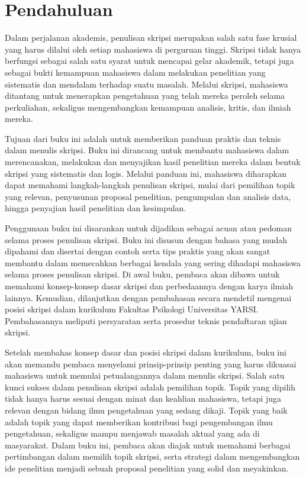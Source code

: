 \documentclass[
  indonesian,
  letterpaper,
]{scrbook}
\author{}
\date{}
\renewcommand*\contentsname{Daftar Isi}
\newcommand\contentsname{Daftar Isi}
\begin{document}
\frontmatter

\renewcommand*\contentsname{Daftar Isi}
{
\setcounter{tocdepth}{2}
\tableofcontents
}

\mainmatter
{}

\chapter*{\texorpdfstring{\textbf{Pendahuluan}}{Pendahuluan}}\label{pendahuluan}


Dalam perjalanan akademis, penulisan skripsi merupakan salah satu fase
krusial yang harus dilalui oleh setiap mahasiswa di perguruan tinggi.
Skripsi tidak hanya berfungsi sebagai salah satu syarat untuk mencapai
gelar akademik, tetapi juga sebagai bukti kemampuan mahasiswa dalam
melakukan penelitian yang sistematis dan mendalam terhadap suatu
masalah. Melalui skripsi, mahasiswa ditantang untuk menerapkan
pengetahuan yang telah mereka peroleh selama perkuliahan, sekaligus
mengembangkan kemampuan analisis, kritis, dan ilmiah mereka.

Tujuan dari buku ini adalah untuk memberikan panduan praktis dan teknis
dalam menulis skripsi. Buku ini dirancang untuk membantu mahasiswa dalam
merencanakan, melakukan dan menyajikan hasil penelitian mereka dalam
bentuk skripsi yang sistematis dan logis. Melalui panduan ini, mahasiswa
diharapkan dapat memahami langkah-langkah penulisan skripsi, mulai dari
pemilihan topik yang relevan, penyusunan proposal penelitian,
pengumpulan dan analisis data, hingga penyajian hasil penelitian dan
kesimpulan.

Penggunaan buku ini disarankan untuk dijadikan sebagai acuan atau
pedoman selama proses penulisan skripsi. Buku ini disusun dengan bahasa
yang mudah dipahami dan disertai dengan contoh serta tips praktis yang
akan sangat membantu dalam memecahkan berbagai kendala yang sering
dihadapi mahasiswa selama proses penulisan skripsi. Di awal buku,
pembaca akan dibawa untuk memahami konsep-konsep dasar skripsi dan
perbedaannya dengan karya ilmiah lainnya. Kemudian, dilanjutkan dengan
pembahasan secara mendetil mengenai posisi skripsi dalam kurikulum
Fakultas Psikologi Universitas YARSI. Pembahasannya meliputi persyaratan
serta prosedur teknis pendaftaran ujian skripsi.

Setelah membahas konsep dasar dan posisi skripsi dalam kurikulum, buku
ini akan memandu pembaca menyelami prinsip-prinsip penting yang harus
dikuasai mahasiswa untuk memulai petualangannya dalam menulis skripsi.
Salah satu kunci sukses dalam penulisan skripsi adalah pemilihan topik.
Topik yang dipilih tidak hanya harus sesuai dengan minat dan keahlian
mahasiswa, tetapi juga relevan dengan bidang ilmu pengetahuan yang
sedang dikaji. Topik yang baik adalah topik yang dapat memberikan
kontribusi bagi pengembangan ilmu pengetahuan, sekaligus mampu menjawab
masalah aktual yang ada di masyarakat. Dalam buku ini, pembaca akan
diajak untuk memahami berbagai pertimbangan dalam memilih topik skripsi,
serta strategi dalam mengembangkan ide penelitian menjadi sebuah
proposal penelitian yang solid dan meyakinkan.
\end{document}
